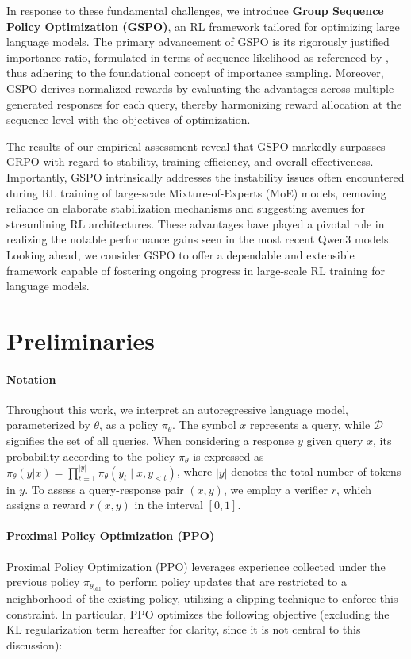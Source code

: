 In response to these fundamental challenges, we introduce \textbf{Group Sequence Policy Optimization (GSPO)}, an RL framework tailored for optimizing large language models. The primary advancement of GSPO is its rigorously justified importance ratio, formulated in terms of sequence likelihood as referenced by \citep{click}, thus adhering to the foundational concept of importance sampling. Moreover, GSPO derives normalized rewards by evaluating the advantages across multiple generated responses for each query, thereby harmonizing reward allocation at the sequence level with the objectives of optimization.

The results of our empirical assessment reveal that GSPO markedly surpasses GRPO with regard to stability, training efficiency, and overall effectiveness. Importantly, GSPO intrinsically addresses the instability issues often encountered during RL training of large-scale Mixture-of-Experts (MoE) models, removing reliance on elaborate stabilization mechanisms and suggesting avenues for streamlining RL architectures. These advantages have played a pivotal role in realizing the notable performance gains seen in the most recent Qwen3 models. Looking ahead, we consider GSPO to offer a dependable and extensible framework capable of fostering ongoing progress in large-scale RL training for language models.

\section{Preliminaries}

\paragraph{Notation}
Throughout this work, we interpret an autoregressive language model, parameterized by $\theta$, as a policy $\pi_\theta$. The symbol $x$ represents a query, while $\mathcal{D}$ signifies the set of all queries. When considering a response $y$ given query $x$, its probability according to the policy $\pi_\theta$ is expressed as $\pi_\theta(y|x) = \prod_{t=1}^{|y|} \pi_\theta(y_t \mid x, y_{<t})$, where $|y|$ denotes the total number of tokens in $y$. To assess a query-response pair $(x, y)$, we employ a verifier $r$, which assigns a reward $r(x, y)$ in the interval $[0, 1]$.

\paragraph{Proximal Policy Optimization (PPO)} Proximal Policy Optimization (PPO) \citep{ppo} leverages experience collected under the previous policy $\pi_{\theta_\text{old}}$ to perform policy updates that are restricted to a neighborhood of the existing policy, utilizing a clipping technique to enforce this constraint. In particular, PPO optimizes the following objective (excluding the KL regularization term hereafter for clarity, since it is not central to this discussion):

